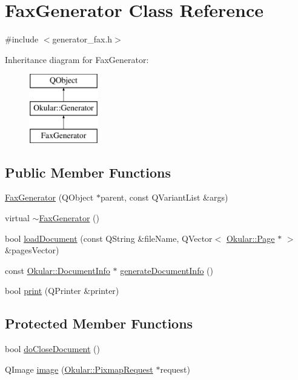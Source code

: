 \hypertarget{classFaxGenerator}{\section{Fax\+Generator Class Reference}
\label{classFaxGenerator}
}


{\ttfamily \#include $<$generator\+\_\+fax.\+h$>$}

Inheritance diagram for Fax\+Generator\+:\begin{figure}[H]
\begin{center}
\leavevmode
\includegraphics[height=3.000000cm]{classFaxGenerator}
\end{center}
\end{figure}
\subsection*{Public Member Functions}
\begin{DoxyCompactItemize}
\item 
\hyperlink{classFaxGenerator_a659a37fc919be555466751c2fdcc46cc}{Fax\+Generator} (Q\+Object $\ast$parent, const Q\+Variant\+List \&args)
\item 
virtual \hyperlink{classFaxGenerator_af7189320300e3cae3fff55512fc0905b}{$\sim$\+Fax\+Generator} ()
\item 
bool \hyperlink{classFaxGenerator_acf99fcddfc0395672ecd7274f7ef4511}{load\+Document} (const Q\+String \&file\+Name, Q\+Vector$<$ \hyperlink{classOkular_1_1Page}{Okular\+::\+Page} $\ast$ $>$ \&pages\+Vector)
\item 
const \hyperlink{classOkular_1_1DocumentInfo}{Okular\+::\+Document\+Info} $\ast$ \hyperlink{classFaxGenerator_ac707f45b286edccfbfeaad725bd05c6b}{generate\+Document\+Info} ()
\item 
bool \hyperlink{classFaxGenerator_ab0ff222d4d10e75cea04f1af8ca8296e}{print} (Q\+Printer \&printer)
\end{DoxyCompactItemize}
\subsection*{Protected Member Functions}
\begin{DoxyCompactItemize}
\item 
bool \hyperlink{classFaxGenerator_aafb9e115ed19679c6af5f18238310b3f}{do\+Close\+Document} ()
\item 
Q\+Image \hyperlink{classFaxGenerator_ac41d5d048aadf8640da77d95458e7b36}{image} (\hyperlink{classOkular_1_1PixmapRequest}{Okular\+::\+Pixmap\+Request} $\ast$request)
\end{DoxyCompactItemize}
